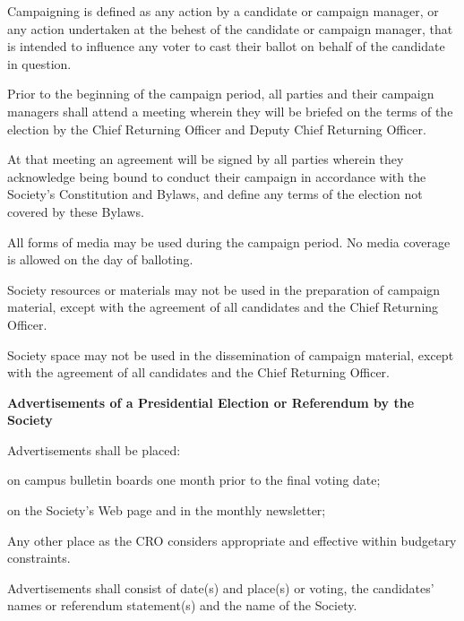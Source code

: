 \begin{longenum}[ label*=\thesection.\arabic*., align=left]
\begin{longenum}[label*=\arabic*., align=left]
 \item Campaigning is defined as any action by a candidate or campaign manager, or any action undertaken at the behest of the candidate or campaign manager, that is intended to influence any voter to cast their ballot on behalf of the candidate in question.
 \item Prior to the beginning of the campaign period, all parties and their campaign managers shall attend a meeting wherein they will be briefed on the terms of the election by the Chief Returning Officer and Deputy Chief Returning Officer.
\item At that meeting an agreement will be signed by all parties wherein they acknowledge being bound to conduct their campaign in accordance with the Society's Constitution and Bylaws, and define any terms of the election not covered by these Bylaws.
\item All  forms of media may be used during  the campaign period. No media coverage is allowed on  the day of balloting.
\item  Society resources or materials may not be used in the preparation of campaign material, except with the agreement of all candidates and the Chief Returning Officer.
\item Society space may not be used in the dissemination of campaign material, except with the agreement of all candidates and the Chief Returning Officer.
 \end{longenum}
 \item 	\textbf{Advertisements	of	a	Presidential	Election	or	Referendum	by	the	Society }
  \begin{longenum}[label*=\arabic*., align=left]
  \item Advertisements shall be placed:
 \begin{longenum}[label*=\arabic*., align=left]
\item on campus bulletin boards one month prior to the final voting date;
\item on the Society's Web page and in the monthly newsletter;
\item Any other place as the CRO considers appropriate and effective within budgetary 
constraints.
 \end{longenum}
\item Advertisements shall consist of date(s) and place(s) or voting, the candidates' names or referendum 
statement(s) and the name of the Society. 
 \end{longenum}
  

\end{longenum}
